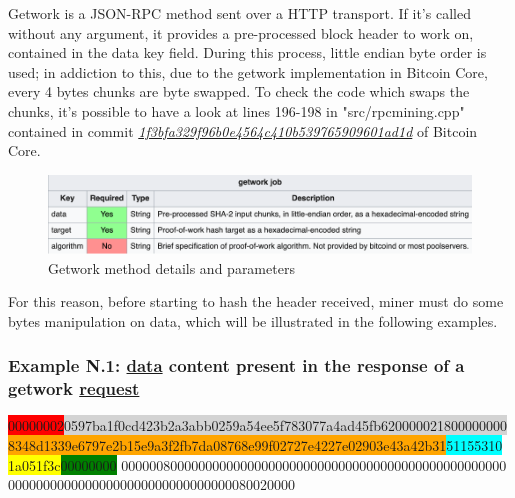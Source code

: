 Getwork is a JSON-RPC method sent over a HTTP transport.
If it's called without any argument, it provides a pre-processed block header to work on, contained in the data key field. During this process, little endian byte order is used; in addiction to this, due to the getwork implementation in Bitcoin Core, every 4 bytes chunks are byte swapped. 
To check the code which swaps the chunks, it's possible to have a look at lines 196-198 in "src/rpcmining.cpp" contained in commit \href{https://github.com/bitcoin/bitcoin/pull/2905/commits/1f3bfa329f96b0e4564c410b539765909601ad1d#diff-aef7835a9e55f9cd866fb418fa6fc7c49f200540746812da4ef44b53cd115e4bL196}{\textit{1f3bfa329f96b0e4564c410b539765909601ad1d}} of Bitcoin Core. 

\begin{figure}[h!]
    \centering
    \includegraphics[width=15cm]{Figures/getwork/getwork5.png}
    \caption{Getwork method details and parameters}
    \label{fig:getwork5}
\end{figure}
\noindent For this reason, before starting to hash the header received, miner must do some bytes manipulation on data, which will be illustrated in the following examples.
\subsubsection{Example N.1:  \underline{data} content present in the response of a getwork \underline{request}}

\colorbox{red}{00000002}\colorbox{lightgray}{0597ba1f0cd423b2a3abb0259a54ee5f783077a4ad45fb620000021800000000}\\\colorbox{orange}{8348d1339e6797e2b15e9a3f2fb7da08768e99f02727e4227e02903e43a42b31}\colorbox{cyan}{51155310}\\\colorbox{yellow}{1a051f3c}\colorbox{green}{00000000} 0000008000000000000000000000000000000000000000000000000\\00000000000000000000000000000000080020000

